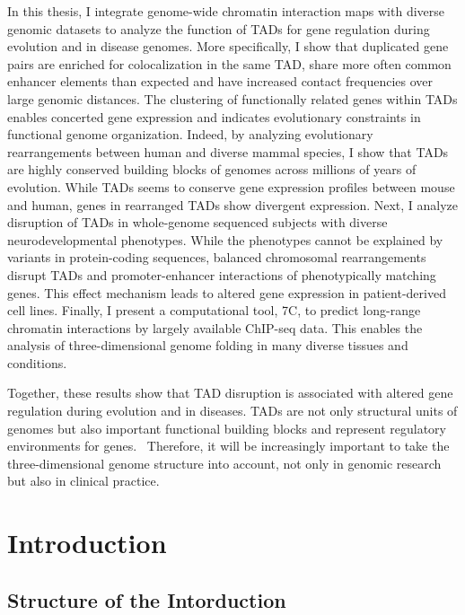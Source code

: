 \documentclass[a4paper,twoside=true,openright,parskip=full,chapterprefix=true,11pt,headings=normal,bibliography=totoc,listof=totoc,titlepage=on,captions=tableabove,draft=false]{scrreprt}
\theoremstyle{definition}
\theoremstyle{definition}
\theoremstyle{definition}
\theoremstyle{remark}
\begin{document}
In this thesis, I integrate genome-wide chromatin interaction maps with
diverse genomic datasets to analyze the function of TADs for gene
regulation during evolution and in disease genomes. More specifically, I
show that duplicated gene pairs are enriched for colocalization in the
same TAD, share more often common enhancer elements than expected and
have increased contact frequencies over large genomic distances. The
clustering of functionally related genes within TADs enables concerted
gene expression and indicates evolutionary constraints in functional
genome organization. Indeed, by analyzing evolutionary rearrangements
between human and diverse mammal species, I show that TADs are highly
conserved building blocks of genomes across millions of years of
evolution. While TADs seems to conserve gene expression profiles between
mouse and human, genes in rearranged TADs show divergent expression.
Next, I analyze disruption of TADs in whole-genome sequenced subjects
with diverse neurodevelopmental phenotypes. While the phenotypes cannot
be explained by variants in protein-coding sequences, balanced
chromosomal rearrangements disrupt TADs and promoter-enhancer
interactions of phenotypically matching genes. This effect mechanism
leads to altered gene expression in patient-derived cell lines. Finally,
I present a computational tool, 7C, to predict long-range chromatin
interactions by largely available ChIP-seq data. This enables the
analysis of three-dimensional genome folding in many diverse tissues and
conditions.

Together, these results show that TAD disruption is associated with
altered gene regulation during evolution and in diseases. TADs are not
only structural units of genomes but also important functional building
blocks and represent regulatory environments for genes.~ Therefore, it
will be increasingly important to take the three-dimensional genome
structure into account, not only in genomic research but also in
clinical practice.

\chapter{Introduction}\label{thesis-intro}

\section{Structure of the
Intorduction}\label{structure-of-the-intorduction}
\end{document}
